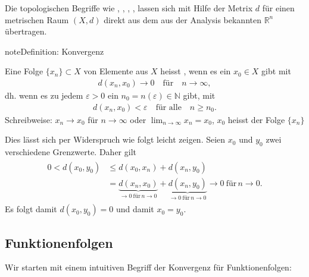 \documentclass[letterpaper,10pt,english]{jupyterBook}
\begin{document}
Die topologischen Begriffe wie , , , ,  lassen sich mit Hilfe der Metrix \(d\) für einen metrischen Raum \((X,d)\) direkt aus dem aus der Analysis bekannten \(\mathbb{R}^n\) übertragen.

\begin{sphinxadmonition}{note}{Definition: Konvergenz}

Eine Folge \(\{x_n\}\subset X\) von Elemente aus \(X\) heisst , wenn es ein \(x_0\in X\) gibt mit
\begin{equation*}
\begin{split}d(x_n,x_0) \to 0\quad \text{für}\quad n\to\infty,\end{split}
\end{equation*}
dh. wenn es zu jedem \(\varepsilon > 0\) ein \(n_0 = n(\varepsilon)\in\mathbb{N}\) gibt, mit
\begin{equation*}
\begin{split}d(x_n,x_0) < \varepsilon\quad\text{für alle}\quad n\ge n_0.\end{split}
\end{equation*}
Schreibweise: \(x_n \to x_0\) für \(n \to \infty\) oder \(\lim_{n\to\infty} x_n = x_0\), \(x_0\) heisst  der Folge \(\{x_n\}\)
\end{sphinxadmonition}

 Dies lässt sich per Widerspruch wie folgt leicht zeigen. Seien \(x_0\) und \(y_0\) zwei verschiedene Grenzwerte. Daher gilt
\begin{equation*}
\begin{split}\begin{split}
0 < d(x_0,y_0) & \le d(x_0, x_n) + d(x_n,y_0)\\
& = \underbrace{d(x_n,x_0)}_{\to 0\ \text{für}\, n\to 0} + \underbrace{d(x_n,y_0)}_{\to 0\ \text{für}\, n\to 0} \to 0\ \text{für}\, n\to 0.\end{split}\end{split}
\end{equation*}
Es folgt damit \(d(x_0,y_0)=0\) und damit \(x_0 = y_0\).


\subsection{Funktionenfolgen}
\label{\detokenize{Funktionalanalysis/GrundlegendeRaeume:funktionenfolgen}}
Wir starten mit einem intuitiven Begriff der Konvergenz für Funktionenfolgen:
\end{document}
